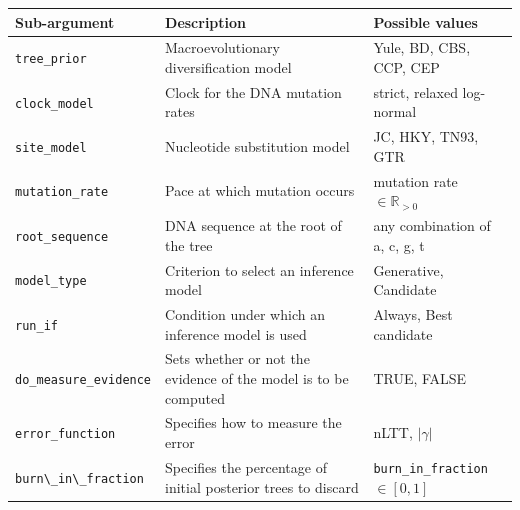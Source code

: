 \documentclass{article}
\begin{document}
\begin{table}
\centering
  \begin{tabular}{|p{3.2cm}|p{9.7cm}|p{4.5cm}@{}|}
    \hline
    \centering
    \textbf{Sub-argument} & 
    \textbf{Description} &
    \textbf{Possible values} \\ 
    \hline
    \verb;tree_prior; &
    Macroevolutionary diversification model &
    Yule, BD, CBS, CCP, CEP \\
    \verb;clock_model; &
    Clock for the DNA mutation rates &
    strict, relaxed log-normal \\
    \verb;site_model; &
    Nucleotide substitution model &
    JC, HKY, TN93, GTR \\
    \verb;mutation_rate; &
    Pace at which mutation occurs &
    mutation rate $\in \mathbb{R}_{>0}$\\
    \verb;root_sequence; &
    DNA sequence at the root of the tree &
    any combination of a, c, g, t \\
    \verb;model_type; &
    Criterion to select an inference model &
    Generative, Candidate \\
    \verb;run_if; &
    Condition under which an inference model is used &
    Always, Best candidate \\
    \verb;do_measure_evidence; &
    Sets whether or not the evidence of the model is to be computed &
    TRUE, FALSE \\
    \verb;error_function; &
    Specifies how to measure the error &
    nLTT, $|\gamma|$ \\
    \verb;burn\_in\_fraction; &
    Specifies the percentage of initial posterior trees to discard &
    \verb;burn_in_fraction; $\in [0, 1]$\\

\end{tabular}
\end{table}
\end{document}
